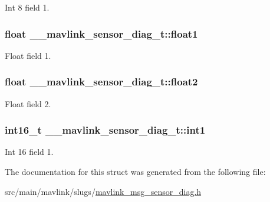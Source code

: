 Int 8 field 1. 

\hypertarget{struct____mavlink__sensor__diag__t_a03cc21136fba58b900332f477e913046}{
\subsubsection[{float1}]{\setlength{\rightskip}{0pt plus 5cm}float \+\_\+\+\_\+mavlink\+\_\+sensor\+\_\+diag\+\_\+t\+::float1}}\label{struct____mavlink__sensor__diag__t_a03cc21136fba58b900332f477e913046}


Float field 1. 

\hypertarget{struct____mavlink__sensor__diag__t_ac12ea4978b29417ad511f8bce68438f2}{
\subsubsection[{float2}]{\setlength{\rightskip}{0pt plus 5cm}float \+\_\+\+\_\+mavlink\+\_\+sensor\+\_\+diag\+\_\+t\+::float2}}\label{struct____mavlink__sensor__diag__t_ac12ea4978b29417ad511f8bce68438f2}


Float field 2. 

\hypertarget{struct____mavlink__sensor__diag__t_a9b6d200beb992b957e608b6d6276f6bf}{
\subsubsection[{int1}]{\setlength{\rightskip}{0pt plus 5cm}int16\+\_\+t \+\_\+\+\_\+mavlink\+\_\+sensor\+\_\+diag\+\_\+t\+::int1}}\label{struct____mavlink__sensor__diag__t_a9b6d200beb992b957e608b6d6276f6bf}


Int 16 field 1. 



The documentation for this struct was generated from the following file\+:\begin{DoxyCompactItemize}
\item 
src/main/mavlink/slugs/\hyperlink{mavlink__msg__sensor__diag_8h}{mavlink\+\_\+msg\+\_\+sensor\+\_\+diag.\+h}\end{DoxyCompactItemize}
